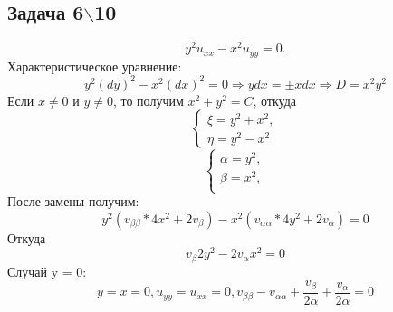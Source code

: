 \documentclass[11pt]{article}
\begin{document}
\subsection{Задача 6$\backslash$10}
\label{sec:orgc4007fe}
\begin{equation}
y^2u_{xx} - x^2u_{yy} = 0.
\end{equation}
Характеристическое уравнение:
\begin{equation}
y^2(dy)^2 - x^2(dx)^2 = 0 \Rightarrow ydx = \pm xdx \Rightarrow D = x^2y^2
\end{equation}
Если $x \neq 0$ и $y \neq 0$, то получим $x^2 + y^2 = C$, откуда
\begin{equation}
\begin{cases}
\xi = y^2 + x^2, \\
\eta = y^2 - x^2
\end{cases}
\end{equation}
\Rightarrow
\begin{equation}
\begin{cases}
\alpha = y^2, \\
\beta = x^2, \\
\end{cases}
\end{equation}
После замены получим:
\begin{equation}
y^2(v_{\beta\beta}*4x^2 + 2v_{\beta}) - x^2(v_{\alpha\alpha}*4y^2 + 2v_{\alpha}) = 0
\end{equation}
Откуда
\begin{equation}
v_{\beta}2y^2 - 2v_{\alpha}x^2 = 0
\end{equation}
Случай y = 0:
\begin{equation}
y = x = 0, u_{yy} = u_{xx} = 0, v_{\beta\beta} - v_{\alpha\alpha} + \frac{v_{\beta}}{2\alpha} + \frac{v_{\alpha}}{2\alpha} = 0
\end{equation}
\end{document}
